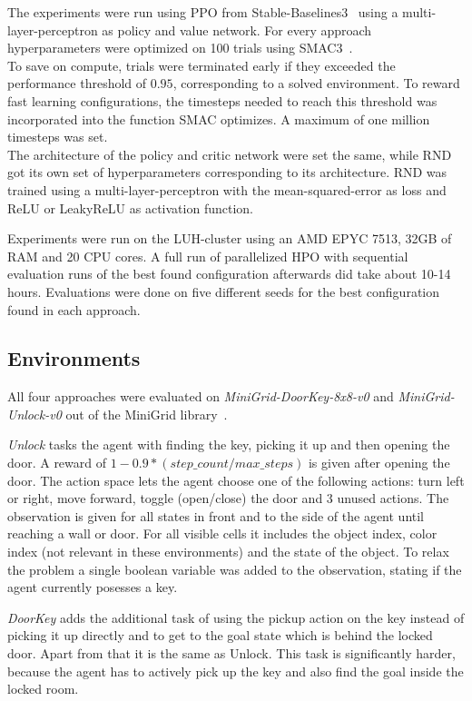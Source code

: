 \documentclass{article}
\begin{document}
The experiments were run using PPO from Stable-Baselines3~\citep{sb3} using a multi-layer-perceptron as policy and value network. For every approach hyperparameters were optimized on 100 trials using SMAC3~\citep{smac}. \\
To save on compute, trials were terminated early if they exceeded the performance threshold of $0.95$, corresponding to a solved environment. To reward fast learning configurations, the timesteps needed to reach this threshold was incorporated into the function SMAC optimizes. A maximum of one million timesteps was set. \\
The architecture of the policy and critic network were set the same, while RND got its own set of hyperparameters corresponding to its architecture. RND was trained using a multi-layer-perceptron with the mean-squared-error as loss and ReLU or LeakyReLU as activation function.

Experiments were run on the LUH-cluster using an AMD EPYC 7513, 32GB of RAM and 20 CPU cores. A full run of parallelized HPO with sequential evaluation runs of the best found configuration afterwards did take about 10-14 hours. Evaluations were done on five different seeds for the best configuration found in each approach.

\subsection{Environments}
\label{sec:environments}

All four approaches were evaluated on \textit{MiniGrid-DoorKey-8x8-v0} and \textit{MiniGrid-Unlock-v0} out of the MiniGrid library~\citep{minigrid}.

\textit{Unlock} tasks the agent with finding the key, picking it up and then opening the door. A reward of $1 - 0.9 * (step\_count / max\_steps)$ is given after opening the door. The action space lets the agent choose one of the following actions: turn left or right, move forward, toggle (open/close) the door and 3 unused actions. The observation is given for all states in front and to the side of the agent until reaching a wall or door. For all visible cells it includes the object index, color index (not relevant in these environments) and the state of the object. To relax the problem a single boolean variable was added to the observation, stating if the agent currently posesses a key.

\textit{DoorKey} adds the additional task of using the pickup action on the key instead of picking it up directly and to get to the goal state which is behind the locked door. Apart from that it is the same as Unlock. This task is significantly harder, because the agent has to actively pick up the key and also find the goal inside the locked room.
\end{document}

